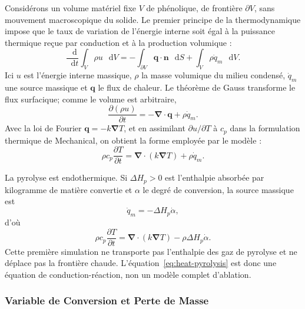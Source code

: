\documentclass[oneside,openany]{amsdtx}
\newcommand{\dd}{\mathop{}\!\mathrm{d}}
\newcommand{\pd}{\partial}
\newcommand{\vect}[1]{\bm{#1}}
\begin{document}
Considérons un volume matériel fixe \(V\) de phénolique, de frontière
\(\partial V\), sans mouvement macroscopique du solide. Le premier principe de
la thermodynamique impose que le taux de variation de l'énergie interne soit
égal à la puissance thermique reçue par conduction et à la production
volumique :
\begin{equation}
  \frac{\dd}{\dd t}\int_V \rho u\,\dd V
  =-\int_{\partial V}\vect q\cdot\vect n\,\dd S
   +\int_V \rho\dot q_m\,\dd V .
  \label{eq:first-law-integral}
\end{equation}
Ici \(u\) est l'énergie interne massique, \(\rho\) la masse volumique du
milieu condensé, \(\dot q_m\) une source massique et \(\vect q\) le flux de
chaleur. Le théorème de Gauss transforme le flux surfacique; comme le volume est
arbitraire,
\begin{equation}
  \frac{\pd(\rho u)}{\pd t}=-\vect\nabla\cdot\vect q+\rho\dot q_m .
\end{equation}
Avec la loi de Fourier \(\vect q=-k\vect\nabla T\), et en assimilant
\(\pd u/\pd T\) à \(c_p\) dans la formulation thermique de Mechanical, on
obtient la forme employée par le modèle :
\begin{equation}
  \rho c_p\frac{\pd T}{\pd t}
  =\vect\nabla\cdot\left(k\vect\nabla T\right)+\rho\dot q_m .
  \label{eq:heat-general}
\end{equation}

La pyrolyse est endothermique. Si \(\Delta H_p>0\) est l'enthalpie absorbée par
kilogramme de matière convertie et \(\alpha\) le degré de conversion, la source
massique est
\begin{equation}
  \dot q_m=-\Delta H_p\dot\alpha,
\end{equation}
d'où
\begin{equation}
  \boxed{\rho c_p\frac{\pd T}{\pd t}
  =\vect\nabla\cdot(k\vect\nabla T)
  -\rho\Delta H_p\dot\alpha.}
  \label{eq:heat-pyrolysis}
\end{equation}
Cette première simulation ne transporte pas l'enthalpie des gaz de pyrolyse et
ne déplace pas la frontière chaude. L'équation~\eqref{eq:heat-pyrolysis} est donc
une équation de conduction-réaction, non un modèle complet d'ablation.

\subsubsection{Variable de Conversion et Perte de Masse}
\end{document}

